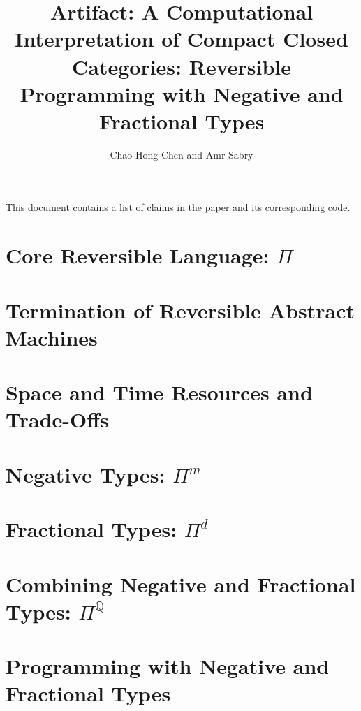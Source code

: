 \documentclass[12pt]{article}
\begin{document}
\title{Artifact: A Computational Interpretation of Compact Closed Categories: Reversible Programming with Negative and Fractional Types}
\author{Chao-Hong Chen and Amr Sabry}
\maketitle

This document contains a list of claims in the paper and its corresponding code.

\section{Core Reversible Language: $\Pi$}

\section{Termination of Reversible Abstract Machines}

\section{Space and Time Resources and Trade-Offs}

\section{Negative Types: $\Pi^m$}

\section{Fractional Types: $\Pi^d$}

\section{Combining Negative and Fractional Types: $\Pi^{\mathbb{Q}}$}

\section{Programming with Negative and Fractional Types}
\end{document}
